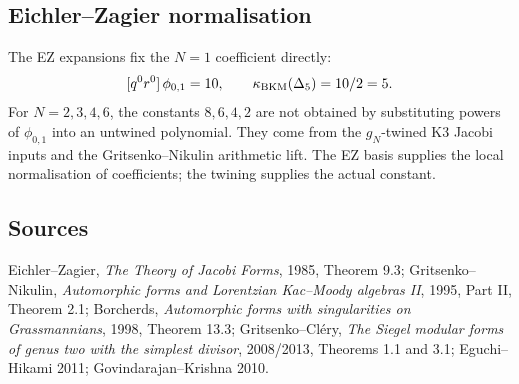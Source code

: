 \subsection*{Eichler--Zagier normalisation}

The EZ expansions fix the \(N=1\) coefficient directly:
\[
  [q^0r^0]\,\phi_{0,1}=10,\qquad
  \kappa_{\mathrm{BKM}}(\Delta_5)=10/2=5.
\]
For \(N=2,3,4,6\), the constants \(8,6,4,2\) are not obtained by
substituting powers of \(\phi_{0,1}\) into an untwined polynomial.
They come from the \(g_N\)-twined K3 Jacobi inputs and the
Gritsenko--Nikulin arithmetic lift.  The EZ basis supplies the local
normalisation of coefficients; the twining supplies the actual
constant.

\subsection*{Sources}

Eichler--Zagier, \emph{The Theory of Jacobi Forms}, 1985, Theorem 9.3;
Gritsenko--Nikulin, \emph{Automorphic forms and Lorentzian
Kac--Moody algebras II}, 1995, Part II, Theorem 2.1; Borcherds,
\emph{Automorphic forms with singularities on Grassmannians}, 1998,
Theorem 13.3; Gritsenko--Cl\'ery, \emph{The Siegel modular forms of
genus two with the simplest divisor}, 2008/2013, Theorems 1.1 and 3.1;
Eguchi--Hikami 2011; Govindarajan--Krishna 2010.
